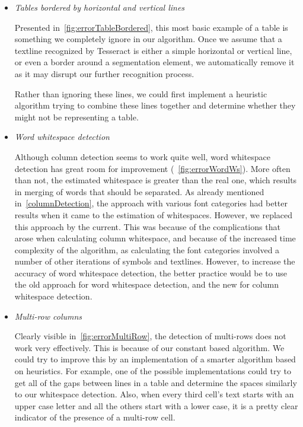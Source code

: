 \begin{itemize}
    \item \emph{Tables bordered by horizontal and vertical lines}
    
    Presented in~\cref{fig:errorTableBordered}, this most basic example of a table is something we completely ignore in our algorithm. Once we assume that a textline recognized by Tesseract is either a simple horizontal or vertical line, or even a border around a segmentation element, we automatically remove it as it may disrupt our further recognition process.
    
    Rather than ignoring these lines, we could first implement a heuristic algorithm trying to combine these lines together and determine whether they might not be representing a table.
    
    \item \emph{Word whitespace detection}

    Although column detection seems to work quite well, word whitespace detection has great room for improvement (~\cref{fig:errorWordWs}). More often than not, the estimated whitespace is greater than the real one, which results in merging of words that should be separated. As already mentioned in~\cref{columnDetection}, the approach with various font categories had better results when it came to the estimation of whitespaces. However, we replaced this approach by the current. This was because of the complications that arose when calculating column whitespace, and because of the increased time complexity of the algorithm, as calculating the font categories involved a number of other iterations of symbols and textlines. However, to increase the accuracy of word whitespace detection, the better practice would be to use the old approach for word whitespace detection, and the new for column whitespace detection. 
    
    \item \emph{Multi-row columns}
    
    Clearly visible in~\cref{fig:errorMultiRow}, the detection of multi-rows does not work very effectively. This is because of our constant based algorithm. We could try to improve this by an implementation of a smarter algorithm based on heuristics. For example, one of the possible implementations could try to get all of the gaps between lines in a table and determine the spaces similarly to our whitespace detection. Also, when every third cell's text starts with an upper case letter and all the others start with a lower case, it is a pretty clear indicator of the presence of a multi-row cell.
    

\end{itemize}
